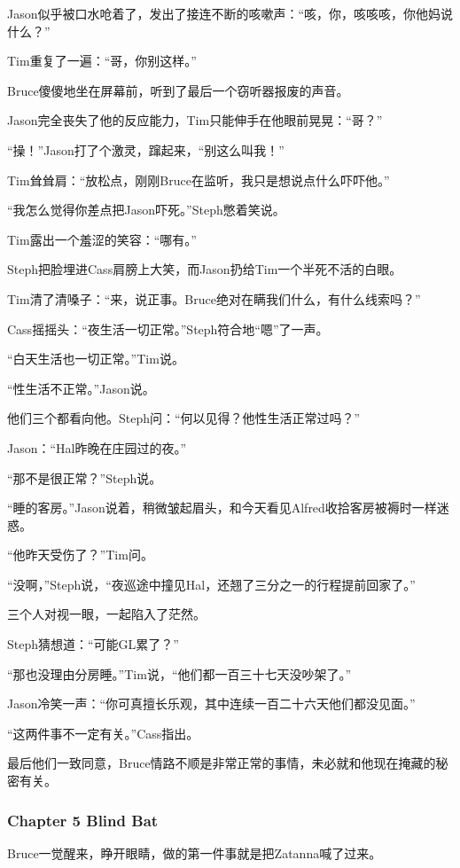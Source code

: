 \documentclass[../main.tex]{subfiles}
\begin{document}
Jason似乎被口水呛着了，发出了接连不断的咳嗽声：“咳，你，咳咳咳，你他妈说什么？”

Tim重复了一遍：“哥，你别这样。”

Bruce傻傻地坐在屏幕前，听到了最后一个窃听器报废的声音。

Jason完全丧失了他的反应能力，Tim只能伸手在他眼前晃晃：“哥？”

“操！”Jason打了个激灵，蹿起来，“别这么叫我！”

Tim耸耸肩：“放松点，刚刚Bruce在监听，我只是想说点什么吓吓他。”

“我怎么觉得你差点把Jason吓死。”Steph憋着笑说。

Tim露出一个羞涩的笑容：“哪有。”

Steph把脸埋进Cass肩膀上大笑，而Jason扔给Tim一个半死不活的白眼。

Tim清了清嗓子：“来，说正事。Bruce绝对在瞒我们什么，有什么线索吗？”

Cass摇摇头：“夜生活一切正常。”Steph符合地“嗯”了一声。

“白天生活也一切正常。”Tim说。

“性生活不正常。”Jason说。

他们三个都看向他。Steph问：“何以见得？他性生活正常过吗？”

Jason：“Hal昨晚在庄园过的夜。”

“那不是很正常？”Steph说。

“睡的客房。”Jason说着，稍微皱起眉头，和今天看见Alfred收拾客房被褥时一样迷惑。

“他昨天受伤了？”Tim问。

“没啊，”Steph说，“夜巡途中撞见Hal，还翘了三分之一的行程提前回家了。”

三个人对视一眼，一起陷入了茫然。

Steph猜想道：“可能GL累了？”

“那也没理由分房睡。”Tim说，“他们都一百三十七天没吵架了。”

Jason冷笑一声：“你可真擅长乐观，其中连续一百二十六天他们都没见面。”

“这两件事不一定有关。”Cass指出。

最后他们一致同意，Bruce情路不顺是非常正常的事情，未必就和他现在掩藏的秘密有关。

\hypertarget{chapter-5-blind-bat}{%
  \subsubsection{Chapter 5 Blind Bat}\label{chapter-5-blind-bat}}

Bruce一觉醒来，睁开眼睛，做的第一件事就是把Zatanna喊了过来。
\end{document}
